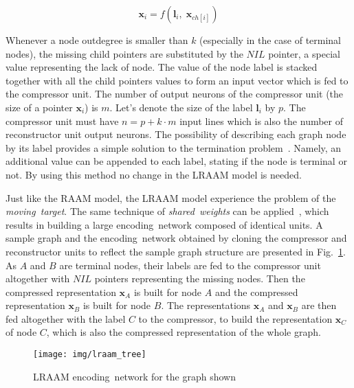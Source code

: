 \begin{equation}
\bm{x}_i = f(\bm{l}_i, \; \bm{x}_{ch[i]})
\label{eq:lraam_pointer}
\end{equation}

Whenever a node outdegree is smaller than $k$ (especially in the case of terminal nodes), the missing child pointers are substituted by the $NIL$ pointer, a special value representing the lack of node. The value of the node label is stacked together with all the child pointers values to form an input vector which is fed to the compressor unit. The number of output neurons of the compressor unit (the size of a pointer $\bm{x}_i$) is $m$. Let's denote the size of the label $\bm{l}_i$ by $p$. The compressor unit must have $n = p + k \cdot m$ input lines which is also the number of reconstructor unit output neurons. The possibility of describing each graph node by its label provides a simple solution to the termination problem~\cite{sperduti1994labelling}. Namely, an additional value can be appended to each label, stating if the node is terminal or not. By using this method no change in the LRAAM model is needed.

Just like the RAAM model, the LRAAM model experience the problem of the \emph{moving~target}. The same technique of \emph{shared~weights} can be applied~\cite{goulon2005hopfield}, which results in building a large encoding~network composed of identical units. A sample graph and the encoding~network obtained by cloning the compressor and reconstructor units to reflect the sample graph structure are presented in Fig.~\ref{fig:lraam_tree}. As $A$ and $B$ are terminal nodes, their labels are fed to the compressor unit altogether with $NIL$ pointers representing the missing nodes. Then the compressed representation $\bm{x}_{A}$ is built for node $A$ and the compressed representation $\bm{x}_{B}$ is built for node $B$. The representations $\bm{x}_A$ and $\bm{x}_B$ are then fed altogether with the label $C$ to the compressor, to build the representation $\bm{x}_C$ of node $C$, which is also the compressed representation of the whole graph.

\begin{figure}
\begin{center}
	\texttt{[image: img/lraam\_tree]}
	\caption{LRAAM encoding~network for the graph shown}
	\label{fig:lraam_tree}
\end{center}
\end{figure}

